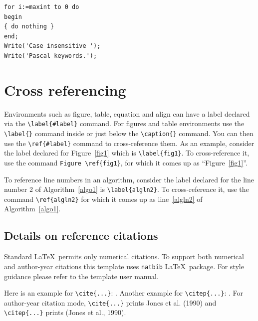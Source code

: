 \documentclass[lineno,pdflatex,sn-nature]{sn-jnl}%
\theoremstyle{thmstyleone}%
\theoremstyle{thmstyletwo}%
\theoremstyle{thmstylethree}%
\begin{document}
\bigskip
\begin{minipage}{\hsize}%
\lstset{frame=single,framexleftmargin=-1pt,framexrightmargin=-17pt,framesep=12pt,linewidth=0.98\textwidth,language=pascal}%
\begin{lstlisting}
for i:=maxint to 0 do
begin
{ do nothing }
end;
Write('Case insensitive ');
Write('Pascal keywords.');
\end{lstlisting}
\end{minipage}

\section{Cross referencing}\label{sec8}

Environments such as figure, table, equation and align can have a label
declared via the \verb+\label{#label}+ command. For figures and table
environments use the \verb+\label{}+ command inside or just
below the \verb+\caption{}+ command. You can then use the
\verb+\ref{#label}+ command to cross-reference them. As an example, consider
the label declared for Figure~\ref{fig1} which is
\verb+\label{fig1}+. To cross-reference it, use the command 
\verb+Figure \ref{fig1}+, for which it comes up as
``Figure~\ref{fig1}''. 

To reference line numbers in an algorithm, consider the label declared for the line number 2 of Algorithm~\ref{algo1} is \verb+\label{algln2}+. To cross-reference it, use the command \verb+\ref{algln2}+ for which it comes up as line~\ref{algln2} of Algorithm~\ref{algo1}.

\subsection{Details on reference citations}\label{subsec7}

Standard \LaTeX\ permits only numerical citations. To support both numerical and author-year citations this template uses \verb+natbib+ \LaTeX\ package. For style guidance please refer to the template user manual.

Here is an example for \verb+\cite{...}+: \cite{bib1}. Another example for \verb+\citep{...}+: \citep{bib2}. For author-year citation mode, \verb+\cite{...}+ prints Jones et al. (1990) and \verb+\citep{...}+ prints (Jones et al., 1990).
\end{document}
